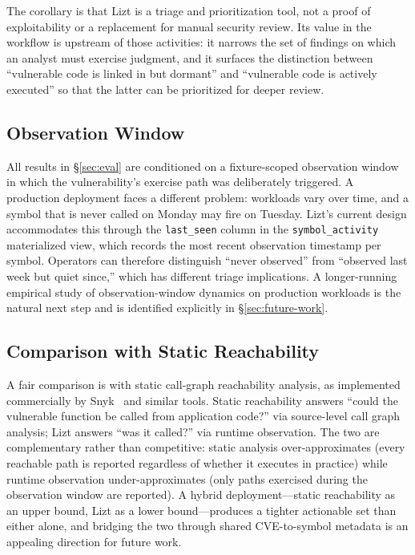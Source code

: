 \documentclass[conference]{IEEEtran}
\begin{document}
The corollary is that Lizt is a triage and prioritization tool, not a proof of exploitability or a replacement for manual security review.
Its value in the workflow is upstream of those activities: it narrows the set of findings on which an analyst must exercise judgment, and it surfaces the distinction between ``vulnerable code is linked in but dormant'' and ``vulnerable code is actively executed'' so that the latter can be prioritized for deeper review.

\subsection{Observation Window}

All results in \S\ref{sec:eval} are conditioned on a fixture-scoped observation window in which the vulnerability's exercise path was deliberately triggered.
A production deployment faces a different problem: workloads vary over time, and a symbol that is never called on Monday may fire on Tuesday.
Lizt's current design accommodates this through the \texttt{last\_seen} column in the \texttt{symbol\_activity} materialized view, which records the most recent observation timestamp per symbol.
Operators can therefore distinguish ``never observed'' from ``observed last week but quiet since,'' which has different triage implications.
A longer-running empirical study of observation-window dynamics on production workloads is the natural next step and is identified explicitly in \S\ref{sec:future-work}.

\subsection{Comparison with Static Reachability}

A fair comparison is with static call-graph reachability analysis, as implemented commercially by Snyk~\cite{snyk} and similar tools.
Static reachability answers ``could the vulnerable function be called from application code?'' via source-level call graph analysis; Lizt answers ``was it called?'' via runtime observation.
The two are complementary rather than competitive: static analysis over-approximates (every reachable path is reported regardless of whether it executes in practice) while runtime observation under-approximates (only paths exercised during the observation window are reported).
A hybrid deployment---static reachability as an upper bound, Lizt as a lower bound---produces a tighter actionable set than either alone, and bridging the two through shared CVE-to-symbol metadata is an appealing direction for future work.
\end{document}
